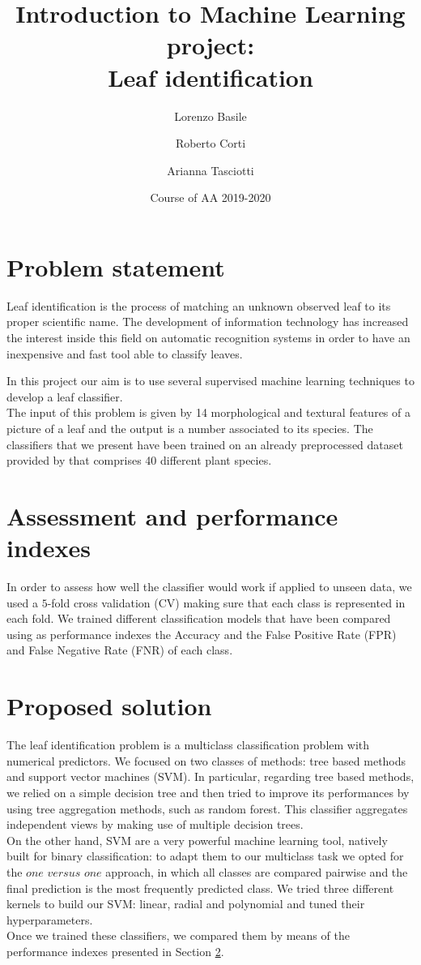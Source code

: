 \documentclass{article}
\title{Introduction to Machine Learning project:\\ Leaf identification}
\author[1]{Lorenzo Basile}
\author[2]{Roberto Corti}
\author[3]{Arianna Tasciotti}
\affil[1,2,3]{
    problem statement,
    solution design,
    solution development,
    writing
}
\date{Course of AA 2019-2020}
\begin{document}
\maketitle



\section{Problem statement}
Leaf identification is the process of matching an unknown observed leaf to its proper scientific name. The development of information technology has increased the interest inside this field on automatic recognition systems in order to have an inexpensive and fast tool able to classify leaves.  

In this project our aim is to use several supervised machine learning techniques to develop a leaf classifier. \\
The input of this problem is given by 14 morphological and textural features of a picture of a leaf and the output is a number associated to its species. The classifiers that we present have been trained on an already preprocessed dataset provided by \cite{silva} that comprises 40 different plant species.

\section{Assessment and performance indexes}\label{2}
In order to assess how well the classifier would work if applied to unseen data, we used a $5$-fold cross validation (CV) making sure that each class is represented in each fold. We trained different classification models that have been compared using as performance indexes the Accuracy and the False Positive Rate (FPR) and False Negative Rate (FNR) of each class.

\section{Proposed solution}\label{3}
The leaf identification problem is a multiclass classification problem with numerical predictors. We focused on two classes of methods: tree based methods and support vector machines (SVM).
In particular, regarding tree based methods, we relied on a simple decision tree and then tried to improve its performances by using tree aggregation methods, such as random forest. This classifier aggregates independent views by making use of multiple decision trees. 
\\On the other hand, SVM are a very powerful machine learning tool, natively built for binary classification: to adapt them to our multiclass task we opted for the $\textit{one versus one}$ approach, in which all classes are compared pairwise and the final prediction is the most frequently predicted class. We tried three different kernels to build our SVM: linear, radial and polynomial and tuned their hyperparameters.
\\Once we trained these classifiers, we compared them by means of the performance indexes presented in Section \ref{2}.
\end{document}
